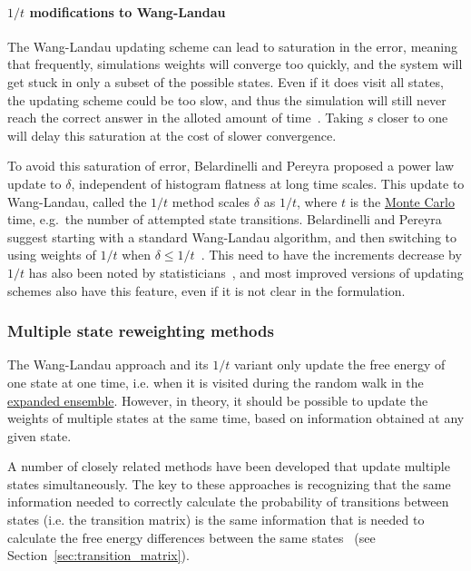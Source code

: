 \documentclass[9pt,review]{livecoms}
\begin{document}
\paragraph{$1/t$ modifications to Wang-Landau}
The Wang-Landau updating scheme can lead to saturation in the error,
meaning that frequently, simulations weights will converge too quickly, and the system will get stuck in only a subset of the possible states.  Even if it does visit all states, the updating scheme could be too slow, and thus the simulation will still  never reach the correct answer in the alloted amount of time~\cite{Belardinelli2007, Belardinelli2008}.  Taking $s$ closer to one will delay this saturation at the cost of slower convergence.

To avoid this saturation of error, Belardinelli and Pereyra proposed a
power law update to $\delta$, independent of histogram flatness at
long time scales. This update to Wang-Landau, called the $1/t$ method
scales $\delta$ as $1/t$, where $t$ is the \hyperlink{ref:MetropolisMonteCarlo} {Monte Carlo} time, e.g.~the
number of attempted state transitions.  Belardinelli and Pereyra
suggest starting with a standard Wang-Landau algorithm, and then
switching to using weights of $1/t$ when $\delta \leq 1/t$~\cite{Belardinelli2008, Belardinelli2007}. This need to have the increments decrease by $1/t$ has also been noted by statisticians~\cite{wl_convergence}, and most improved versions of updating schemes also have this feature, even if it is not clear in the formulation.

\subsubsection{\label{sec:multiplestatemethods}Multiple state reweighting methods}

The Wang-Landau approach and its $1/t$ variant only update the free energy of one state at one time, i.e. when it is visited during the random walk in the \hyperlink{ref:ExpEns} {expanded ensemble}.  However, in theory, it should be possible to update the weights of multiple states at the same time, based on information obtained at any given state.

A number of closely related methods have been developed that update multiple states simultaneously. The key to these approaches is recognizing that the same information needed to correctly calculate the probability of  transitions between states (i.e. the transition matrix) is the same information that is needed to calculate the free energy differences between the same states~\cite{escobedo_transition_2006,Wang:JoSP:2002} (see Section~\ref{sec:transition_matrix}).
\end{document}
